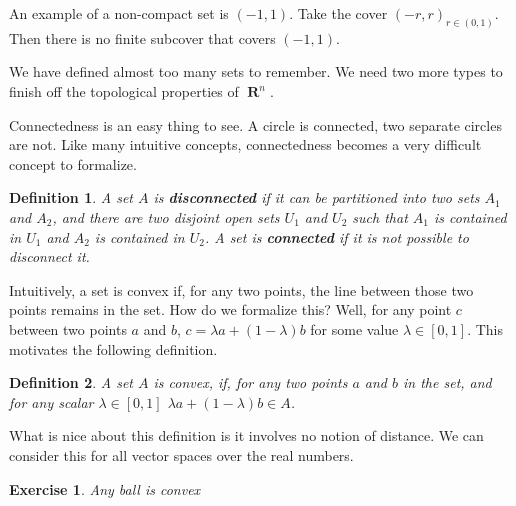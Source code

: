 \documentclass{report}
\newtheorem{definition}{Definition}
\newtheorem{exercise}{Exercise}
\DeclareMathOperator{\real}{\mathbf{R}}
\begin{document}
An example of a non-compact set is $(-1,1)$. Take the cover $(-r,r)_{r \in (0,1)}$. Then there is no finite subcover that covers $(-1,1)$.

We have defined almost too many sets to remember. We need two more types to finish off the topological properties of $\real^n$.

Connectedness is an easy thing to see. A circle is connected, two separate circles are not. Like many intuitive concepts, connectedness becomes a very difficult concept to formalize.

\begin{definition}
  A set $A$ is {\bf disconnected} if it can be partitioned into two sets $A_1$ and $A_2$, and there are two disjoint open sets $U_1$ and $U_2$ such that $A_1$ is contained in $U_1$ and $A_2$ is contained in $U_2$. A set is {\bf connected} if it is not possible to disconnect it.
\end{definition}

Intuitively, a set is convex if, for any two points, the line between those two points remains in the set. How do we formalize this? Well, for any point $c$ between two points $a$ and $b$, $c = \lambda a + (1 - \lambda)b$ for some value $\lambda \in [0,1]$. This motivates the following definition.

\begin{definition}
  A set $A$ is convex, if, for any two points $a$ and $b$ in the set, and for any scalar $\lambda \in [0,1]$ $\lambda a + (1 - \lambda) b \in A$.
\end{definition}

What is nice about this definition is it involves no notion of distance. We can consider this for all vector spaces over the real numbers.

\begin{exercise}
  Any ball is convex
\end{exercise}
\end{document}
